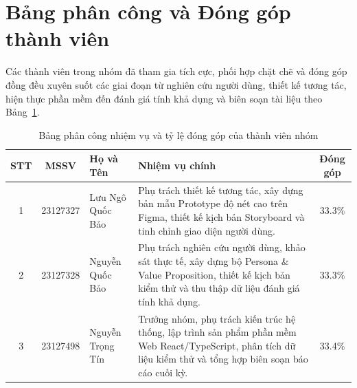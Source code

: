 \newpage
\section{Bảng phân công và Đóng góp thành viên}

Các thành viên trong nhóm đã tham gia tích cực, phối hợp chặt chẽ và đóng góp đồng đều xuyên suốt các giai đoạn từ nghiên cứu người dùng, thiết kế tương tác, hiện thực phần mềm đến đánh giá tính khả dụng và biên soạn tài liệu theo Bảng~\ref{tab:team_contribution}.

\begin{table}[H]
\centering
\small
\setlength{\tabcolsep}{4pt}
\renewcommand{\arraystretch}{1.2}
\begin{tabularx}{\textwidth}{|c|c|l|X|c|}
\hline
\textbf{STT} & \textbf{MSSV} & \textbf{Họ và Tên} & \textbf{Nhiệm vụ chính} & \textbf{Đóng góp} \\ \hline
1 & 23127327 & Lưu Ngô Quốc Bảo & Phụ trách thiết kế tương tác, xây dựng bản mẫu Prototype độ nét cao trên Figma, thiết kế kịch bản Storyboard và tinh chỉnh giao diện người dùng. & 33.3\% \\ \hline
2 & 23127328 & Nguyễn Quốc Bảo & Phụ trách nghiên cứu người dùng, khảo sát thực tế, xây dựng bộ Persona \& Value Proposition, thiết kế kịch bản kiểm thử và thu thập dữ liệu đánh giá tính khả dụng. & 33.3\% \\ \hline
3 & 23127498 & Nguyễn Trọng Tín & Trưởng nhóm, phụ trách kiến trúc hệ thống, lập trình sản phẩm phần mềm Web React/TypeScript, phân tích dữ liệu kiểm thử và tổng hợp biên soạn báo cáo cuối kỳ. & 33.4\% \\ \hline
\end{tabularx}
\caption{Bảng phân công nhiệm vụ và tỷ lệ đóng góp của thành viên nhóm}
\label{tab:team_contribution}
\end{table}
